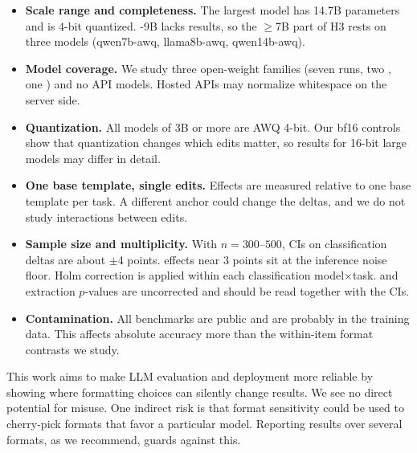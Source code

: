 \begin{itemize}[leftmargin=*,itemsep=0pt,topsep=0pt]
    \item {\bf Scale range and completeness.} The largest model has 14.7B parameters and is 4-bit quantized. \gemma-9B lacks \ifeval results, so the $\geq$7B part of H3 rests on three models (qwen7b-awq, llama8b-awq, qwen14b-awq).
    \item {\bf Model coverage.} We study three open-weight families (seven \qwen runs, two \llama, one \gemma) and no API models. Hosted APIs may normalize whitespace on the server side.
    \item {\bf Quantization.} All models of 3B or more are AWQ 4-bit. Our bf16 controls show that quantization changes which edits matter, so results for 16-bit large models may differ in detail.
    \item {\bf One base template, single edits.} Effects are measured relative to one base template per task. A different anchor could change the deltas, and we do not study interactions between edits.
    \item {\bf Sample size and multiplicity.} With $n=300$--$500$, CIs on classification deltas are about $\pm$4 points. \ifeval effects near 3 points sit at the inference noise floor. Holm correction is applied within each classification model$\times$task. \ifeval and extraction $p$-values are uncorrected and should be read together with the CIs.
    \item {\bf Contamination.} All benchmarks are public and are probably in the training data. This affects absolute accuracy more than the within-item format contrasts we study.
\end{itemize}

 This work aims to make LLM evaluation and deployment more reliable by showing where formatting choices can silently change results. We see no direct potential for misuse. One indirect risk is that format sensitivity could be used to cherry-pick formats that favor a particular model. Reporting results over several formats, as we recommend, guards against this.
